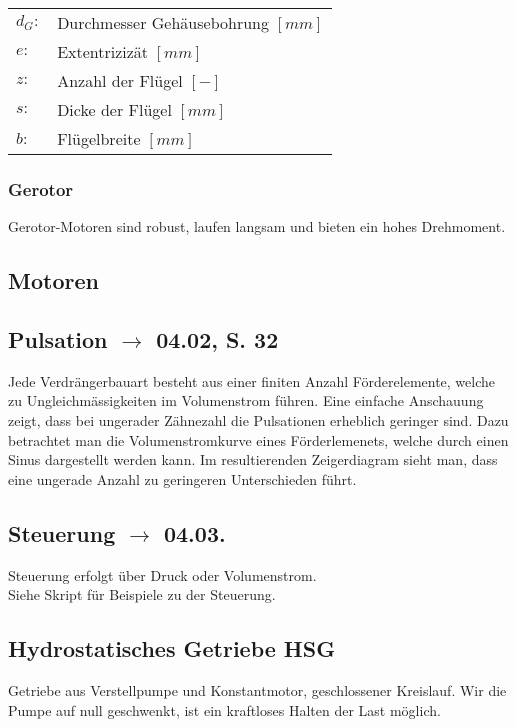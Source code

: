 \begin{tabular}{ll}
$d_G:$ & Durchmesser Gehäusebohrung $[mm]$\\
$e:$ & Extentrizizät $[mm]$\\
$z:$ & Anzahl der Flügel $[-]$\\
$s:$ & Dicke der Flügel $[mm]$\\
$b:$ & Flügelbreite $[mm]$
\end{tabular}


\subsubsection{Gerotor}
Gerotor-Motoren sind robust, laufen langsam und bieten ein hohes Drehmoment. 

\subsection{Motoren}

\subsection{Pulsation $\rightarrow$ 04.02, S. 32}
Jede Verdrängerbauart besteht aus einer finiten Anzahl Förderelemente, welche zu Ungleichmässigkeiten im Volumenstrom führen. Eine einfache Anschauung zeigt, dass bei ungerader Zähnezahl die Pulsationen erheblich geringer sind. Dazu betrachtet man die Volumenstromkurve eines Förderlemenets, welche durch einen Sinus dargestellt werden kann. Im resultierenden Zeigerdiagram sieht man, dass eine ungerade Anzahl zu geringeren Unterschieden führt. 

\subsection{Steuerung $\rightarrow$ 04.03.}
Steuerung erfolgt über Druck oder Volumenstrom. \\
Siehe Skript für Beispiele zu der Steuerung. 

\subsection{Hydrostatisches Getriebe HSG}
Getriebe aus Verstellpumpe und Konstantmotor, geschlossener Kreislauf. Wir die Pumpe auf null geschwenkt, ist ein kraftloses Halten der Last möglich.\\

